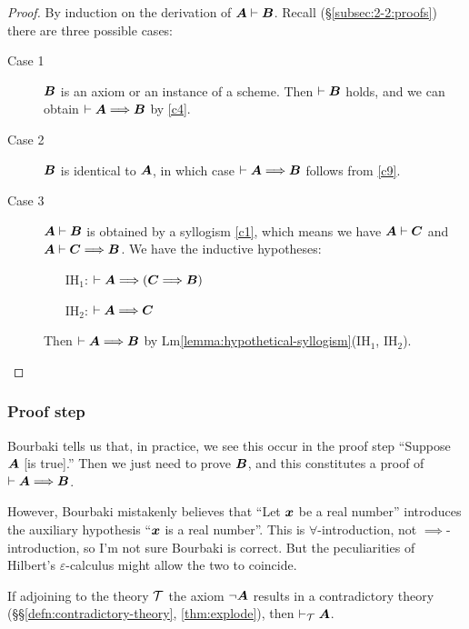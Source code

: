 \begin{proof}
By induction on the derivation of $\boldsymbol{A}\vdash\boldsymbol{B}$.
Recall (\S\ref{subsec:2-2:proofs}) there are three possible cases:
\begin{description}
\item[Case 1] $\boldsymbol{B}$ is an axiom or an instance of a
  scheme. Then $\vdash\boldsymbol{B}$ holds, and we can obtain
  $\vdash\boldsymbol{A}\Longrightarrow\boldsymbol{B}$ by \ref{c4}.
\item[Case 2] $\boldsymbol{B}$ is identical to $\boldsymbol{A}$, in
  which case $\vdash\boldsymbol{A}\Longrightarrow\boldsymbol{B}$ follows
  from \ref{c9}.
\item[Case 3] $\boldsymbol{A}\vdash\boldsymbol{B}$ is obtained by a
  syllogism \ref{c1}, which means we have
  $\boldsymbol{A}\vdash\boldsymbol{C}$ and
  $\boldsymbol{A}\vdash\boldsymbol{C}\Longrightarrow\boldsymbol{B}$. We
  have the inductive hypotheses:
  \begin{itemize}
  \item[IH${}_{1}$:] $\vdash\boldsymbol{A}\Longrightarrow(\boldsymbol{C}\Longrightarrow\boldsymbol{B})$
  \item[IH${}_{2}$:] $\vdash\boldsymbol{A}\Longrightarrow\boldsymbol{C}$
  \end{itemize}
\noindent Then $\vdash\boldsymbol{A}\Longrightarrow\boldsymbol{B}$ by Lm\ref{lemma:hypothetical-syllogism}(IH${}_{1}$, IH${}_{2}$).\qedhere
\end{description}
\end{proof}

\subsubsection{Proof step}
Bourbaki tells us that, in practice, we see this occur in the proof step
``Suppose $\boldsymbol{A}$ [is true].'' Then we just need to prove
$\boldsymbol{B}$, and this constitutes a proof of $\vdash\boldsymbol{A}\Longrightarrow\boldsymbol{B}$.

However, Bourbaki mistakenly believes that ``Let $\boldsymbol{x}$ be a
real number'' introduces the auxiliary hypothesis ``$\boldsymbol{x}$
is a real number''. This is $\forall$-introduction, not
$\implies$-introduction, so I'm not sure Bourbaki is correct. But the
peculiarities of Hilbert's $\varepsilon$-calculus might allow the two to
coincide. 


\begin{dc}\label{c15}%
If adjoining to the theory $\mathcal{T}$ the axiom $\neg\boldsymbol{A}$
results in a contradictory theory (\S\S\ref{defn:contradictory-theory}, \ref{thm:explode}),
then $\vdash_{\mathcal{T}}\boldsymbol{A}$.
\end{dc}

